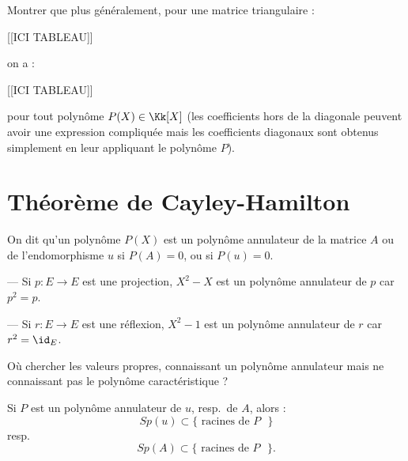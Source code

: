 \documentclass[class=report,crop=false]{standalone}
\newcommand{\Sp}{Sp}
\begin{document}
\begin{exercicecours}
Montrer que plus généralement, pour une matrice triangulaire :

[[ICI TABLEAU]]

on a :

[[ICI TABLEAU]]


pour tout polynôme $P(X)  \in \Kk[X]$ (les coefficients hors de la diagonale peuvent avoir une expression compliquée mais les coefficients diagonaux sont obtenus simplement en leur appliquant le polynôme $P$).
\end{exercicecours}


\section{Th\'eorème de Cayley-Hamilton}

\begin{definition}
On dit qu'un polynôme $P(X)$ est un polynôme annulateur  de la matrice $A$ ou de l'endomorphisme $u$ si $P(A) =0$, ou si $P(u) =0$. 
\end{definition}

\begin{exemple}
--- Si $p : E \to E$ est une projection, $X^2-X$ est un polynôme annulateur de $p$ car $p^2=p$.

--- Si $r : E \to E$ est une réflexion, $X^2-1$ est un polynôme annulateur de $r$ car $r^2 =\id_E$. 
\end{exemple}

Où chercher les valeurs propres, connaissant un polynôme annulateur mais ne connaissant pas le polynôme caractéristique ?
\begin{proposition}
Si $P$ est un polynôme annulateur de $u$, resp.\ de $A$, alors :
\[\Sp (u) \subset \{\mbox{ racines de $P$ }\}\]
resp.
\[\Sp (A) \subset \{\mbox{ racines de $P$ }\}.\]
\end{proposition}
\end{document}

